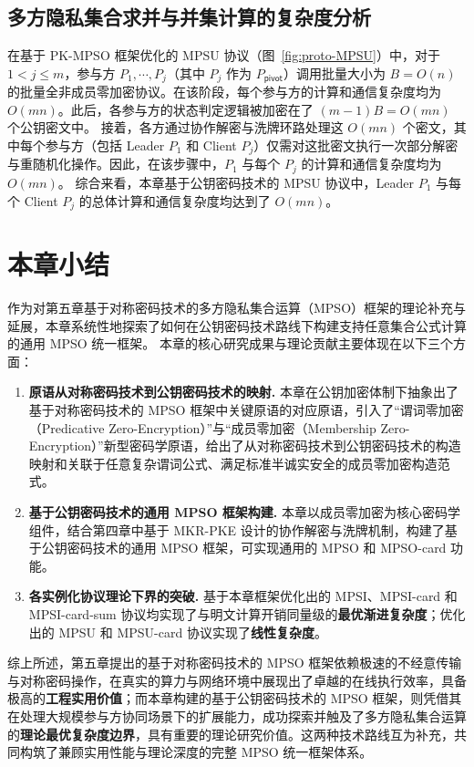 \subsection{多方隐私集合求并与并集计算的复杂度分析}

在基于 PK-MPSO 框架优化的 MPSU 协议（图~\ref{fig:proto-MPSU}）中，对于 $1 < j \le m$，参与方 $P_1, \cdots, P_j$（其中 $P_j$ 作为 $P_\mathsf{pivot}$）调用批量大小为 $B = O(n)$ 的批量全非成员零加密协议。在该阶段，每个参与方的计算和通信复杂度均为 $O(mn)$。此后，各参与方的状态判定逻辑被加密在了 $(m-1)B = O(mn)$ 个公钥密文中。
接着，各方通过协作解密与洗牌环路处理这 $O(mn)$ 个密文，其中每个参与方（包括 Leader $P_1$ 和 Client $P_j$）仅需对这批密文执行一次部分解密与重随机化操作。因此，在该步骤中，$P_1$ 与每个 $P_j$ 的计算和通信复杂度均为 $O(mn)$。
综合来看，本章基于公钥密码技术的 MPSU 协议中，Leader $P_1$ 与每个 Client $P_j$ 的总体计算和通信复杂度均达到了 $O(mn)$。

\section{本章小结}

作为对第五章基于对称密码技术的多方隐私集合运算（MPSO）框架的理论补充与延展，本章系统性地探索了如何在公钥密码技术路线下构建支持任意集合公式计算的通用 MPSO 统一框架。
本章的核心研究成果与理论贡献主要体现在以下三个方面：
\begin{enumerate}
    \item \textbf{原语从对称密码技术到公钥密码技术的映射.} 本章在公钥加密体制下抽象出了基于对称密码技术的 MPSO 框架中关键原语的对应原语，引入了“谓词零加密（Predicative Zero-Encryption）”与“成员零加密（Membership Zero-Encryption）”新型密码学原语，给出了从对称密码技术到公钥密码技术的构造映射和关联于任意复杂谓词公式、满足标准半诚实安全的成员零加密构造范式。
    \item \textbf{基于公钥密码技术的通用 MPSO 框架构建.} 本章以成员零加密为核心密码学组件，结合第四章中基于 MKR-PKE 设计的协作解密与洗牌机制，构建了基于公钥密码技术的通用 MPSO 框架，可实现通用的 MPSO 和 MPSO-card 功能。
    \item \textbf{各实例化协议理论下界的突破.} 基于本章框架优化出的 MPSI、MPSI-card 和 MPSI-card-sum 协议均实现了与明文计算开销同量级的\textbf{最优渐进复杂度}；优化出的 MPSU 和 MPSU-card 协议实现了\textbf{线性复杂度}。
\end{enumerate}

综上所述，第五章提出的基于对称密码技术的 MPSO 框架依赖极速的不经意传输与对称密码操作，在真实的算力与网络环境中展现出了卓越的在线执行效率，具备极高的\textbf{工程实用价值}；而本章构建的基于公钥密码技术的 MPSO 框架，则凭借其在处理大规模参与方协同场景下的扩展能力，成功探索并触及了多方隐私集合运算的\textbf{理论最优复杂度边界}，具有重要的理论研究价值。这两种技术路线互为补充，共同构筑了兼顾实用性能与理论深度的完整 MPSO 统一框架体系。